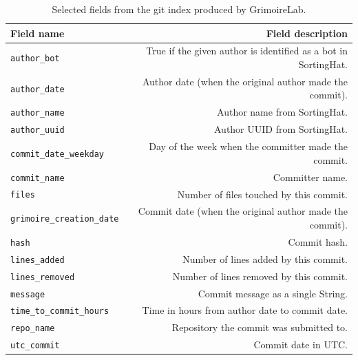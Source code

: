 \documentclass[a4paper, 12pt]{book}
\begin{document}
\begin{table}[b]  %
 \renewcommand{\arraystretch}{1.2}  %
 \begin{center}
  \begin{tabular}{ l  r }
    \toprule    %
      \textbf{Field name} & \textbf{Field description} \\ 
      \midrule %
      \texttt{author\_bot} & True if the given author is identified as a bot in SortingHat. \\
      \texttt{author\_date} & Author date (when the original author made the commit). \\
      \texttt{author\_name} & Author name from SortingHat. \\
      \texttt{author\_uuid} & Author UUID from SortingHat. \\
      \texttt{commit\_date\_weekday} & Day of the week when the committer made the commit. \\
      \texttt{commit\_name} & Committer name. \\
      \texttt{files} & Number of files touched by this commit. \\
      \texttt{grimoire\_creation\_date} & Commit date (when the original author made the commit). \\
      \texttt{hash} & Commit hash. \\
      \texttt{lines\_added} & Number of lines added by this commit. \\
      \texttt{lines\_removed} & Number of lines removed by this commit. \\
      \texttt{message} & Commit message as a single String. \\
      \texttt{time\_to\_commit\_hours} & Time in hours from author date to commit date. \\
      \texttt{repo\_name} & Repository the commit was submitted to. \\
      \texttt{utc\_commit} & Commit date in UTC. \\
    \bottomrule     %
  \end{tabular}
  \caption{Selected fields from the git index produced by GrimoireLab.}
  \label{table:es-git-selected-fields}
 \end{center}
\end{table}
\end{document}
